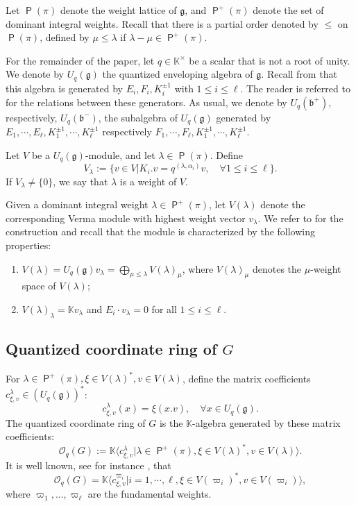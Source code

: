 \documentclass[11pt]{article}
\theoremstyle{definition}
\numberwithin{equation}{section}
\newcommand{\KK}{\mathbb{K}}
\newcommand{\qu}{\mathcal{O}}
\DeclareMathOperator{\pois}{\mathsf{P}}
\newcommand\g{\mathfrak{g}}
\newcommand\bor{\mathfrak{b}}
\begin{document}
Let $\pois(\pi)$ denote the weight lattice  of $\g$, and $\pois^{+}(\pi)$ denote the set of dominant integral weights. Recall that there is  a partial order denoted by $\le$ on $\pois(\pi)$, defined by  $\mu\le\lambda$ if $\lambda- \mu\in\pois^+(\pi)$.

For the remainder of the paper, let $q \in \KK^{\times}$ be a scalar that is not a root of unity. We denote by $U_q(\g)$ the quantized enveloping algebra of $\g$. Recall from \cite[2.1 and 3.1]{JL94} that this algebra is generated by $E_i, F_i,  K_i^{\pm1}$ with $1\leq i \leq \ell$. The reader is referred to \cite[2.1 and 3.1]{JL94} for the relations between these generators. As usual, we denote by $U_q(\bor^{+})$,  respectively, $U_q(\bor^{-})$, the subalgebra of $U_q(\g)$ generated by $E_1,\cdots, E_{\ell}, K_1^{\pm1},\cdots,K_{\ell}^{\pm1}$ respectively $F_1,\cdots,F_{\ell}, K_1^{\pm1},\cdots,K_{\ell}^{\pm1}$. 

Let $V$ be a $U_q(\g)$-module, and  let $\lambda\in\pois(\pi)$. Define
$$V_{\lambda}:= \{v\in V| K_i.v= q^{(\lambda,\alpha_i)}v,\quad
\forall 1\le i\le \ell\}.$$
If $V_{\lambda} \neq \{0\}$, we say that $\lambda$ is a weight of $V$.

Given a dominant integral weight $\lambda \in \pois^+(\pi)$, let $V(\lambda)$ denote the corresponding Verma module with highest weight vector $v_{\lambda}$. We refer to \cite[I.6.12]{BG02} for the construction and recall that the module is characterized by the following properties:
\begin{enumerate}
	\item[(i)]  $V(\lambda) = U_q(\g)v_{\lambda} = \bigoplus_{\mu \le \lambda} V(\lambda)_{\mu}$, where $V(\lambda)_{\mu}$ denotes the $\mu$-weight space of $V(\lambda)$;
	\item[(ii)] $V(\lambda)_{\lambda} = \KK v_{\lambda}$ and $E_i \cdot v_{\lambda} = 0$ for all $1 \le i \le \ell$. 
\end{enumerate}


\subsection{Quantized coordinate ring of $G$}

For $\lambda\in \pois^+(\pi), \xi\in V(\lambda)^{\ast}, v\in V(\lambda)$, define the matrix coefficients $c_{\xi,v}^{\lambda}\in(U_q(\g))^{\ast}$:
$$c_{\xi,v}^{\lambda}(x)= \xi(x.v), \quad \forall x\in U_q(\g).$$
The quantized coordinate ring of $G$ is the $\KK$-algebra generated by these matrix coefficients:
$$\qu_q(G):= \KK\langle c_{\xi,v}^{\lambda} | \lambda\in\pois^{+}(\pi), \xi\in V(\lambda)^{\ast}, v\in V(\lambda)\rangle.$$ 
It is well known, see for instance \cite[Proposition I.7.8]{BG02}, that 
$$\qu_q(G)= \KK\langle c_{\xi,v}^{\varpi_i} | i=1,\cdots,\ell , \xi\in V(\varpi_i)^{\ast},v\in V(\varpi_i)\rangle , $$
where $\varpi_1, \dots, \varpi_{\ell}$ are the fundamental weights.
\end{document}
